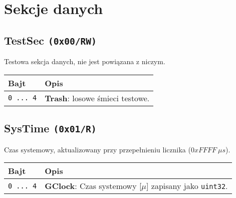 \section{Sekcje danych}
\label{Sec_SekcjeDanych}

\subsection{TestSec \texttt{(0x00/RW)}}
\label{TestSec}
Testowa sekcja danych, nie jest powiązana z niczym.
\begin{longtable}{|p{\BWIDTH}|p{\OWIDTH}|}
	\hline
	\textbf{Bajt} & \textbf{Opis}\\ 
	\hline
	\hline
	\texttt{0 ... 4} & \textbf{Trash}: losowe śmieci testowe.\\
	\hline
\end{longtable}

\subsection{SysTime \texttt{(0x01/R)}}
\label{SysTime}
Czas systemowy, aktualizowany przy przepełnieniu licznika ($0xFFFF\ \mu s$).
\begin{longtable}{|p{\BWIDTH}|p{\OWIDTH}|}
	\hline
	\textbf{Bajt} & \textbf{Opis}\\ 
	\hline
	\hline
	\texttt{0 ... 4} & \textbf{GClock}: Czas systemowy [$\mu$] zapisany jako \texttt{uint32}.\\
	\hline
\end{longtable}